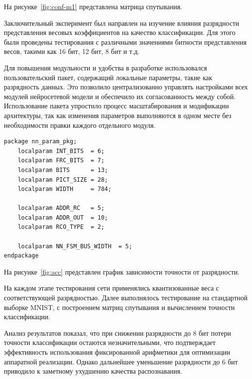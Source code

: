 На рисунке~\ref{fig:conf-m1} представлена матрица спутывания.


\anonsection{}Заключительный эксперимент был направлен на изучение влияния 
разрядности представления весовых коэффициентов на качество классификации. Для 
этого были проведены тестирования с различными значениями битности 
представления весов, такими как 16 бит, 12 бит, 8 бит и т.д.

Для повышения модульности и удобства в разработке 
использовался пользовательский пакет, содержащий локальные параметры, такие как 
разрядность данных. Это позволило централизованно управлять настройками всех 
модулей нейросетевой модели и обеспечило их согласованность между собой. 
Использование пакета упростило процесс масштабирования и модификации 
архитектуры, так как изменения параметров выполняются в одном месте без 
необходимости правки каждого отдельного модуля.

\small
\fontsize{12pt}{12pt}\selectfont
\begin{verbatim}
package nn_param_pkg;
    localparam INT_BITS  = 6;
    localparam FRC_BITS  = 7;
    localparam BITS      = 13;
    localparam PICT_SIZE = 28;
    localparam WIDTH     = 784;
  
    localparam ADDR_RC   = 5;
    localparam ADDR_OUT  = 10;
    localparam RCO_TYPE  = 2;
  
    localparam NN_FSM_BUS_WIDTH  = 5;
endpackage
\end{verbatim}
\normalsize
\fontsize{14pt}{14pt}\selectfont

  На рисунке~\ref{fig:acc} представлен график зависимости точности от 
разрядности.


На каждом этапе тестирования сети применялись квантизованные веса с 
соответствующей разрядностью. Далее выполнялось тестирование на стандартной 
выборке MNIST, с построением матриц спутывания и вычислением точности 
классификации.

Анализ результатов показал, что при снижении разрядности до 8 бит потери 
точности классификации остаются незначительными, что подтверждает эффективность 
использования фиксированной арифметики для оптимизации аппаратной реализации. 
Однако дальнейшее уменьшение разрядности до 6 бит приводило к заметному 
ухудшению качества распознавания.

